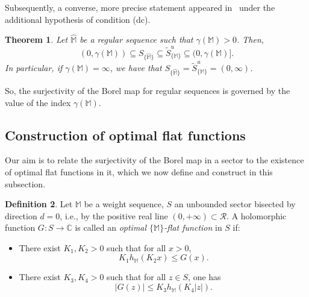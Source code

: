 \documentclass[11pt,a4paper]{article}
\theoremstyle{plain}
\newtheorem{theo}{Theorem}[section]
\theoremstyle{definition}
\newtheorem{defi}[theo]{Definition}
\newcommand{\C}{\mathbb{C}}
\newcommand{\M}{\mathbb{M}}
\newcommand{\hM}{\widehat{\M}}
\def\ga{\gamma}
\begin{document}
Subsequently, a converse, more precise statement appeared in~\cite[Th.~3.7]{JimenezSanzSchindlSurjectDC} under the additional hypothesis of condition (dc).

\begin{theo}\label{teorSurject.dc}
Let $\hM$ be a regular sequence such that $\gamma(\M)>0$. Then,
$$(0,\gamma(\M))\subseteq S_{\{\hM\}}\subseteq \widetilde{S}^u_{\{\M\}}\subseteq
(0,\gamma(\M)].
$$
In particular, if $\gamma(\M)= \infty$, we have that $S_{\{\hM\}}= \widetilde{S}^u_{\{\M\}}= (0,\infty)$.
\end{theo}

So, the surjectivity of the Borel map for regular sequences is governed by the value of the index $\ga(\M)$.

\subsection{Construction of optimal flat functions}

Our aim is to relate the surjectivity of the Borel map in a sector to the existence of optimal flat functions in it, which we now define and construct in this subsection.

\begin{defi}\label{optimalflatdef}
Let $\M$ be a weight sequence, $S$ an unbounded sector bisected by direction $d=0$, i.e., by the positive real line $(0,+\infty)\subset\mathcal{R}$. A holomorphic function $G\colon S\to\C$ is called an \emph{optimal $\{\M\}$-flat function} in $S$ if:
	\begin{itemize}
		\item[$(i)$] There exist $K_1,K_2>0$ such that for all $x>0$,
		\begin{equation}\label{optimalflatleft}
			K_1h_{\M}(K_2x)\le G(x).
		\end{equation}
		
		\item[$(ii)$] There exist $K_3,K_4>0$ such that for all $z\in S$, one has
		\begin{equation}\label{optimalflatright}
			|G(z)|\le K_3h_{\M}(K_4|z|).
		\end{equation}
	\end{itemize}
\end{defi}
\end{document}
